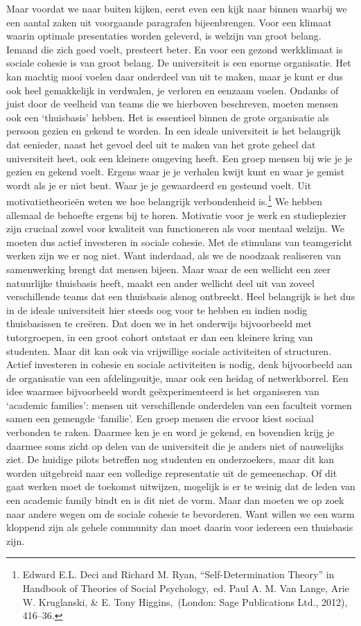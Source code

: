 \documentclass{jote-book}
\begin{document}
	Maar voordat we naar buiten kijken, eerst even een kijk naar binnen waarbij we een aantal zaken uit voorgaande paragrafen bijeenbrengen. Voor een klimaat waarin optimale presentaties worden geleverd, is welzijn van groot belang. Iemand die zich goed voelt, presteert beter. En voor een gezond werkklimaat is sociale cohesie is van groot belang. De universiteit is een enorme organisatie. Het kan machtig mooi voelen daar onderdeel van uit te maken, maar je kunt er dus ook heel gemakkelijk in verdwalen, je verloren en eenzaam voelen. Ondanks of juist door de veelheid van teams die we hierboven beschreven, moeten mensen ook een ‘thuisbasis' hebben. Het is essentieel binnen de grote organisatie als persoon gezien en gekend te worden. In een ideale universiteit is het belangrijk dat eenieder, naast het gevoel deel uit te maken van het grote geheel dat universiteit heet, ook een kleinere omgeving heeft. Een groep mensen bij wie je je gezien en gekend voelt. Ergens waar je je verhalen kwijt kunt en waar je gemist wordt als je er niet bent. Waar je je gewaardeerd en gesteund voelt. Uit motivatietheorieën weten we hoe belangrijk verbondenheid is.\footnote{Edward E.L. Deci and Richard M. Ryan, “Self-Determination Theory” in Handbook of Theories of Social Psychology, ed. Paul A. M. Van Lange, Arie W. Kruglanski, \& E. Tony Higgins, (London: Sage Publications Ltd., 2012), 416--36. } We hebben allemaal de behoefte ergens bij te horen. Motivatie voor je werk en studieplezier zijn cruciaal zowel voor kwaliteit van functioneren als voor mentaal welzijn. We moeten dus actief investeren in sociale cohesie. Met de stimulans van teamgericht werken zijn we er nog niet. Want inderdaad, als we de noodzaak realiseren van samenwerking brengt dat mensen bijeen. Maar waar de een wellicht een zeer natuurlijke thuisbasis heeft, maakt een ander wellicht deel uit van zoveel verschillende teams dat een thuisbasis alsnog ontbreekt. Heel belangrijk is het dus in de ideale universiteit hier steeds oog voor te hebben en indien nodig thuisbasissen te creëren. Dat doen we in het onderwijs bijvoorbeeld met tutorgroepen, in een groot cohort ontstaat er dan een kleinere kring van studenten. Maar dit kan ook via vrijwillige sociale activiteiten of structuren. Actief investeren in cohesie en sociale activiteiten is nodig, denk bijvoorbeeld aan de organisatie van een afdelingsuitje, maar ook een heidag of netwerkborrel. Een idee waarmee bijvoorbeeld wordt geëxperimenteerd is het organiseren van ‘academic families': mensen uit verschillende onderdelen van een faculteit vormen samen een gemengde ‘familie'. Een groep mensen die ervoor kiest sociaal verbonden te raken. Daarmee ken je en word je gekend, en bovendien krijg je daarmee soms zicht op delen van de universiteit die je anders niet of nauwelijks ziet. De huidige pilots betreffen nog studenten en onderzoekers, maar dit kan worden uitgebreid naar een volledige representatie uit de gemeenschap. Of dit gaat werken moet de toekomst uitwijzen, mogelijk is er te weinig dat de leden van een academic family bindt en is dit niet de vorm. Maar dan moeten we op zoek naar andere wegen om de sociale cohesie te bevorderen. Want willen we een warm kloppend zijn als gehele community dan moet daarin voor iedereen een thuisbasis zijn.
\end{document}
